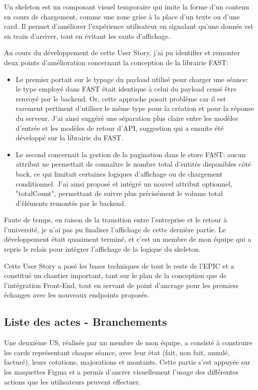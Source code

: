 \documentclass{article}
\begin{document}
Un skeleton est un composant visuel temporaire qui imite la forme d'un contenu en cours de chargement, comme une zone grise à la place d'un texte ou d'une card. Il permet d'améliorer l'expérience utilisateur en signalant qu'une donnée est en train d'arriver, tout en évitant les sauts d'affichage.

Au cours du développement de cette User Story, j'ai pu identifier et remonter deux points d'amélioration concernant la conception de la librairie FAST:
\begin{itemize}
    \item Le premier portait sur le typage du payload utilisé pour charger une séance: le type employé dans FAST était identique à celui du payload censé être renvoyé par le backend. Or, cette approche posait problème car il est rarement pertinent d'utiliser le même type pour la création et pour la réponse du serveur. J'ai ainsi suggéré une séparation plus claire entre les modèles d'entrée et les modèles de retour d'API, suggestion qui a ensuite été développé sur la librairie du FAST.
    \item Le second concernait la gestion de la pagination dans le store FAST: aucun attribut ne permettait de connaître le nombre total d'entités disponibles côté back, ce qui limitait certaines logiques d'affichage ou de chargement conditionnel. J'ai ainsi proposé et intégré un nouvel attribut optionnel, "totalCount", permettant de suivre plus précisément le volume total d'éléments remontés par le backend.
\end{itemize}

Faute de temps, en raison de la transition entre l'entreprise et le retour à l'université, je n'ai pas pu finaliser l'affichage de cette dernière partie. Le développement était quasiment terminé, et c'est un membre de mon équipe qui a repris le relais pour intégrer l'affichage de la logique du skeleton.

Cette User Story a posé les bases techniques de tout le reste de l'EPIC et a constitué un chantier important, tant sur le plan de la conception que de l'intégration Front-End, tout en servant de point d'ancrage pour les premiers échanges avec les nouveaux endpoints proposés.

\subsection{Liste des actes - Branchements}

Une deuxième US, réalisée par un membre de mon équipe, a consisté à construire les cards représentant chaque séance, avec leur état (fait, non fait, annulé, facturé), leurs cotations, majorations et montants. Cette partie s'est appuyée sur les maquettes Figma et a permis d'ancrer visuellement l'usage des différentes actions que les utilisateurs peuvent effectuer. \\
\end{document}
